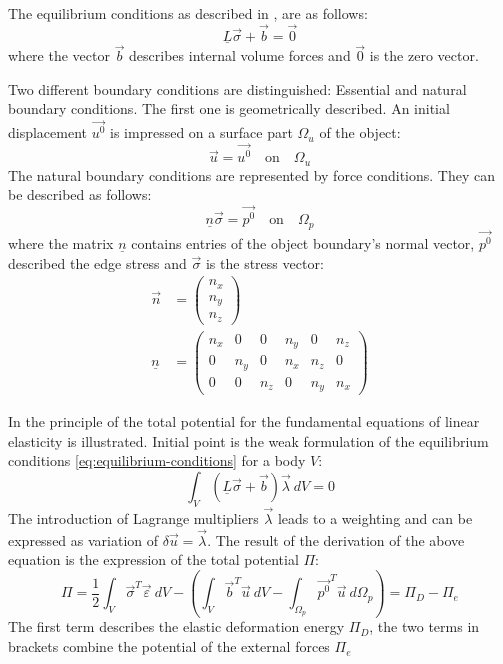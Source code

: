  The equilibrium conditions as described in \cite{steinke2005finite}, are as follows:
 \begin{equation}\label{eq:equilibrium-conditions}
 \underline{L} \vec{\sigma} + \vec{b} = \vec{0}
 \end{equation}
 where the vector $\vec{b}$ describes internal volume forces and $\vec{0}$ is the zero vector.
 
 Two different boundary conditions are distinguished: Essential and natural boundary conditions. The first one is geometrically described. An initial displacement $\vec{u^0}$ is impressed on a surface part $\Omega_u$ of the object:
 \begin{equation}
 \vec{u} = \vec{u^0}\quad \text{on}\quad \Omega_u
 \end{equation}
 The natural boundary conditions are represented by force conditions. They can be described as follows:
 \begin{equation}
 \underline{n} \vec{\sigma} = \vec{p^0}\quad \text{on}\quad \Omega_p
 \end{equation}
 where the matrix $\underline{n}$ contains entries of the object boundary's normal vector, $\vec{p^0}$ described the edge stress and $\vec{\sigma}$ is the stress vector:
 \begin{align}
 \vec{n} &= \begin{pmatrix}
 n_x\\n_y\\n_z
 \end{pmatrix}\\
 \underline{n} &= \begin{pmatrix}
 n_x & 0 & 0 & n_y & 0 & n_z\\
 0 & n_y & 0 & n_x & n_z & 0\\
 0 & 0 & n_z & 0 & n_y & n_x
 \end{pmatrix}
 \end{align}
 
 In \cite{steinke2005finite} the principle of the total potential for the fundamental equations of linear elasticity is illustrated. Initial point is the weak formulation of the equilibrium conditions \eqref{eq:equilibrium-conditions} for a body $V$:
 \begin{equation}
 \int_{V} \left(\underline{L} \vec{\sigma} + \vec{b}\right) \vec{\lambda}\ dV = 0
 \end{equation}
 The introduction of Lagrange multipliers $\vec{\lambda}$ leads to a weighting and can be expressed as variation of $\delta \vec{u} = \vec{\lambda}$. The result of the derivation of the above equation is the expression of the total potential $\Pi$:
 \begin{equation}
 \Pi = \frac{1}{2} \int_{V} \vec{\sigma}^T \vec{\varepsilon}\ dV - \left(\int_{V}\vec{b}^T \vec{u}\ dV - \int_{\Omega_p} \vec{p^0}^T \vec{u}\ d\Omega_p\right) = \Pi_D - \Pi_e
 \end{equation}
 The first term describes the elastic deformation energy $\Pi_D$, the two terms in brackets combine the potential of the external forces $\Pi_e$
 
